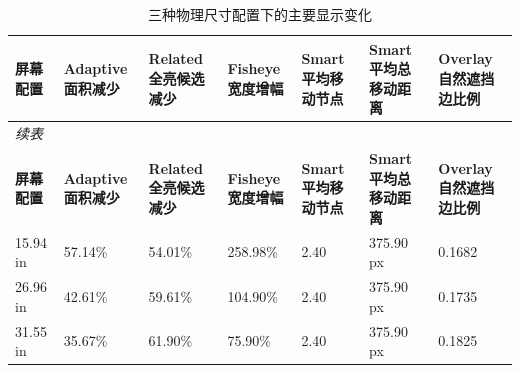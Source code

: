 \documentclass[11pt,a4paper,oneside,extrafontsizes]{memoir}
\begin{document}
\begin{center}

\begin{longtable}{@{}p{} p{} p{} p{} p{} p{} p{}@{}}
\caption{三种物理尺寸配置下的主要显示变化}\label{tab:screen-size-results}\\
\toprule
\textbf{屏幕配置} & \textbf{Adaptive 面积减少} & \textbf{Related 全亮候选减少} & \textbf{Fisheye 宽度增幅} & \textbf{Smart 平均移动节点} & \textbf{Smart 平均总移动距离} & \textbf{Overlay 自然遮挡边比例} \\
\midrule
\endfirsthead
\multicolumn{7}{l}{\itshape 续表}\\
\toprule
\textbf{屏幕配置} & \textbf{Adaptive 面积减少} & \textbf{Related 全亮候选减少} & \textbf{Fisheye 宽度增幅} & \textbf{Smart 平均移动节点} & \textbf{Smart 平均总移动距离} & \textbf{Overlay 自然遮挡边比例} \\
\midrule
\endhead
15.94 in & 57.14\% & 54.01\% & 258.98\% & 2.40 & 375.90 px & 0.1682 \\
26.96 in & 42.61\% & 59.61\% & 104.90\% & 2.40 & 375.90 px & 0.1735 \\
31.55 in & 35.67\% & 61.90\% & 75.90\% & 2.40 & 375.90 px & 0.1825 \\
\bottomrule
\end{longtable}


\end{center}
\end{document}
